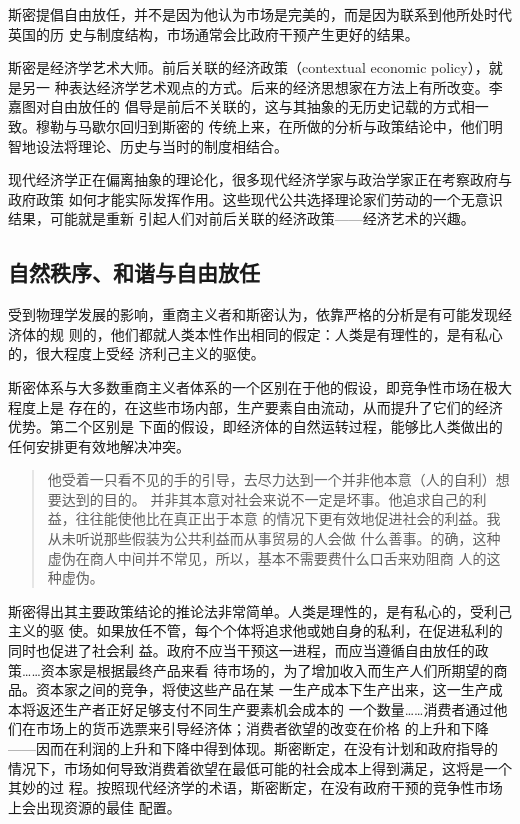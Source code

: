 斯密提倡自由放任，并不是因为他认为市场是完美的，而是因为联系到他所处时代英国的历
史与制度结构，市场通常会比政府干预产生更好的结果。

斯密是经济学艺术大师。前后关联的经济政策（contextual economic policy），就是另一
种表达经济学艺术观点的方式。后来的经济思想家在方法上有所改变。李嘉图对自由放任的
倡导是前后不关联的，这与其抽象的无历史记载的方式相一致。穆勒与马歇尔回归到斯密的
传统上来，在所做的分析与政策结论中，他们明智地设法将理论、历史与当时的制度相结合。

现代经济学正在偏离抽象的理论化，很多现代经济学家与政治学家正在考察政府与政府政策
如何才能实际发挥作用。这些现代公共选择理论家们劳动的一个无意识结果，可能就是重新
引起人们对前后关联的经济政策——经济艺术的兴趣。

\subsection{自然秩序、和谐与自由放任}

受到物理学发展的影响，重商主义者和斯密认为，依靠严格的分析是有可能发现经济体的规
则的，他们都就人类本性作出相同的假定：人类是有理性的，是有私心的，很大程度上受经
济利己主义的驱使。

斯密体系与大多数重商主义者体系的一个区别在于他的假设，即竞争性市场在极大程度上是
存在的，在这些市场内部，生产要素自由流动，从而提升了它们的经济优势。第二个区别是
下面的假设，即经济体的自然运转过程，能够比人类做出的任何安排更有效地解决冲突。

\begin{quotation}
  他受着一只看不见的手的引导，去尽力达到一个并非他本意（人的自利）想要达到的目的。
  并非其本意对社会来说不一定是坏事。他追求自己的利益，往往能使他比在真正出于本意
  的情况下更有效地促进社会的利益。我从未听说那些假装为公共利益而从事贸易的人会做
  什么善事。的确，这种虚伪在商人中间并不常见，所以，基本不需要费什么口舌来劝阻商
  人的这种虚伪。
\end{quotation}

斯密得出其主要政策结论的推论法非常简单。人类是理性的，是有私心的，受利己主义的驱
使。如果放任不管，每个个体将追求他或她自身的私利，在促进私利的同时也促进了社会利
益。政府不应当干预这一进程，而应当遵循自由放任的政策……资本家是根据最终产品来看
待市场的，为了增加收入而生产人们所期望的商品。资本家之间的竞争，将使这些产品在某
一生产成本下生产出来，这一生产成本将返还生产者正好足够支付不同生产要素机会成本的
一个数量……消费者通过他们在市场上的货币选票来引导经济体；消费者欲望的改变在价格
的上升和下降——因而在利润的上升和下降中得到体现。斯密断定，在没有计划和政府指导的
情况下，市场如何导致消费着欲望在最低可能的社会成本上得到满足，这将是一个其妙的过
程。按照现代经济学的术语，斯密断定，在没有政府干预的竞争性市场上会出现资源的最佳
配置。

